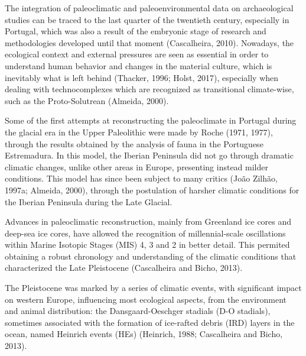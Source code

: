 \documentclass[12pt,twoside]{reedthesis}
\begin{document}
The integration of paleoclimatic and paleoenvironmental data on archaeological studies can be traced to the last quarter of the twentieth century, especially in Portugal, which was also a result of the embryonic stage of research and methodologies developed until that moment (Cascalheira, 2010). Nowadays, the ecological context and external pressures are seen as essential in order to understand human behavior and changes in the material culture, which is inevitably what is left behind (Thacker, 1996; Holst, 2017), especially when dealing with technocomplexes which are recognized as transitional climate-wise, such as the Proto-Solutrean (Almeida, 2000).

Some of the first attempts at reconstructing the paleoclimate in Portugal during the glacial era in the Upper Paleolithic were made by Roche (1971, 1977), through the results obtained by the analysis of fauna in the Portuguese Estremadura. In this model, the Iberian Peninsula did not go through dramatic climatic changes, unlike other areas in Europe, presenting instead milder conditions. This model has since been subject to many critics (João Zilhão, 1997a; Almeida, 2000), through the postulation of harsher climatic conditions for the Iberian Peninsula during the Late Glacial.

Advances in paleoclimatic reconstruction, mainly from Greenland ice cores and deep-sea ice cores, have allowed the recognition of millennial-scale oscillations within Marine Isotopic Stages (MIS) 4, 3 and 2 in better detail. This permited obtaining a robust chronology and understanding of the climatic conditions that characterized the Late Pleistocene (Cascalheira and Bicho, 2013).

The Pleistocene was marked by a series of climatic events, with significant impact on western Europe, influencing most ecological aspects, from the environment and animal distribution: the Dansgaard-Oeschger stadials (D-O stadials), sometimes associated with the formation of ice-rafted debris (IRD) layers in the ocean, named Heinrich events (HEs) (Heinrich, 1988; Cascalheira and Bicho, 2013).
\end{document}
